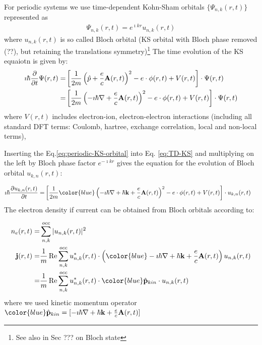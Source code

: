 \documentclass[11pt]{article}
\begin{document}
 For periodic systems   we use time-dependent Kohn-Sham orbitals $\{ \Psi_{n,k}(r,t)\}$  represented as
\begin{align}
    \Psi_{n,k} (r,t) = e^{\imath  kr} u_{n,k}(r,t) 
    \label{eq:periodic-KS-orbital}
\end{align}
where  $u_{n,k}(r,t)$ is so called Bloch orbital (KS orbital with  Bloch phase removed (??), but retaining the translations symmetry)\footnote{ See also \cite{Springborg-book-2000}  in Sec ???  on Bloch state}
The time evolution of the KS equaiotn is given by:
\begin{align}
    \imath \hbar \pdv{}{t} \Psi(r,t)  = & 
    \left[ \frac{1}{2m} \left( \hat p +\frac{e}{c} \vb A(r,t)\right)^2   -e \cdot \phi (r,t) + V(r,t) \right] \cdot \Psi(r,t)  \\
    =&  \left[ \frac{1}{2m} \left(  -\imath \hbar \nabla +\frac{e}{c} \vb A(r,t)\right)^2   -e \cdot \phi (r,t) + V(r,t) \right] \cdot \Psi(r,t)
    \label{eq:TD-KS0}
\end{align}
where $V(r,t)$ includes electron-ion,  electron-electron  interactions (including all standard DFT terms: Coulomb, hartree, exchange correlation, local and non-local terms),

Inserting  the  Eq.\ref{eq:periodic-KS-orbital}  into Eq. \ref{eq:TD-KS} and multiplying on the left  by Bloch phase factor $e^{-\imath k r }$   gives  the equation for the evolution of Bloch orbital $u_{k,n}(r,t)$:

\begin{align}
    \imath \hbar \pdv{ u_{k,n}(r,t)}{t} 
    =&  \left[ \frac{1}{2m} {\color{blue}  \left( -\imath \hbar \nabla + \hbar \vb k + \frac{e}{c} \vb A(r,t)\right)}^2   -e \cdot \phi (r,t) + V(r,t) \right] \cdot  u_{k,n}(r,t)
    \label{eq:TD-KS}
\end{align}
The electron density  if current  can be obtained from  Bloch orbitals according to:

\begin{align}
 n_e(r,t) =& \sum_{n,k}^{occ}  |u_{n,k}(r,t)|^2 \\
  \vb j(r,t) =&   \frac{1}{m} \Re \sum_{n,k}^{occ}  u_{n,k}^*(r,t) \cdot  \left( {\color{blue}  -\imath \hbar \nabla + \hbar \vb k + \frac{e}{c} \vb A(r,t) } \right)  u_{n,k}(r,t) \\
  =&  \frac{1}{m} \Re \sum_{n,k}^{occ}  u_{n,k}^*(r,t) \cdot  {\color{blue}  \hat {\vb p}_{kin} } \cdot u_{n,k}(r,t)  \nonumber
\end{align}
where we used kinetic  momentum operator  $ {\color{blue}  \hat {\vb p}_{kin} =  [-\imath \hbar \nabla + \hbar \vb k + \frac{e}{c} \vb A(r,t) ] } $
\end{document}
